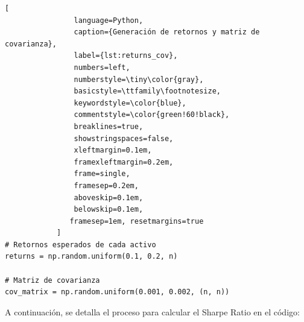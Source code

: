 \documentclass[9pt,a4paper,twoside]{rho-class/rho}
\begin{document}
            \begin{lstlisting}[
                language=Python,
                caption={Generación de retornos y matriz de covarianza},
                label={lst:returns_cov},
                numbers=left,
                numberstyle=\tiny\color{gray},
                basicstyle=\ttfamily\footnotesize,
                keywordstyle=\color{blue},
                commentstyle=\color{green!60!black},
                breaklines=true,
                showstringspaces=false,
                xleftmargin=0.1em,
                framexleftmargin=0.2em,
                frame=single,
                framesep=0.2em,
                aboveskip=0.1em,
                belowskip=0.1em,
               framesep=1em, resetmargins=true
            ]
# Retornos esperados de cada activo
returns = np.random.uniform(0.1, 0.2, n)

# Matriz de covarianza
cov_matrix = np.random.uniform(0.001, 0.002, (n, n))
            \end{lstlisting}
            A continuación, se detalla el proceso para calcular el Sharpe Ratio en el código:\\
\end{document}
